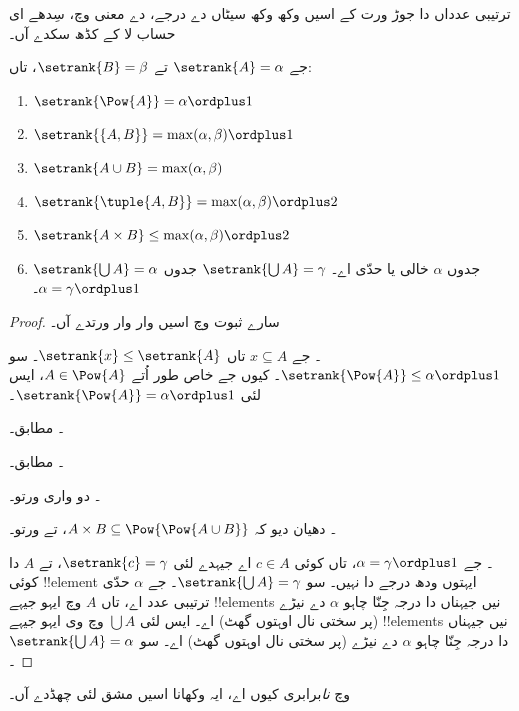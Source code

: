 \documentclass[../../../include/open-logic-section]{subfiles}
\begin{document}

ترتیبی عدداں دا جوڑ ورت کے اسیں وکھ وکھ سیٹاں دے درجے،  دے معنی وچ، سِدھے ای حساب لا کے کڈھ سکدے آں۔

\begin{lem}
جے $\setrank{A} = \alpha$ تے $\setrank{B} = \beta$، تاں:
\begin{enumerate}
	\item{} $\setrank{\Pow{A}} = \alpha\ordplus 1$
	\item{} $\setrank{\{A, B\}} = \max(\alpha,
	\beta) \ordplus 1$
	\item{} $\setrank{A \cup B} = \max(\alpha,
	\beta)$
	\item{} $\setrank{\tuple{A,B}} = \max(\alpha,
	\beta) \ordplus  2$
	\item{} $\setrank{A \times B} \leq \max(\alpha,
	\beta) \ordplus  2$
	\item{} $\setrank{\bigcup A} = \alpha$ جدوں
	$\alpha$ خالی یا حدّی اے۔ $\setrank{\bigcup A} = \gamma$ جدوں
	$\alpha = \gamma\ordplus 1$۔
\end{enumerate}
\end{lem}

\begin{proof}
سارے ثبوت وچ اسیں  وار وار ورتدے آں۔

\emph{۔} جے $x \subseteq A$ تاں $\setrank{x} \leq
\setrank{A}$۔ سو $\setrank{\Pow{A}} \leq \alpha \ordplus  1$۔ کیوں جے خاص طور اُتے $A
\in \Pow{A}$، ایس لئی $\setrank{\Pow{A}} = \alpha \ordplus  1$۔

\emph{۔}  مطابق۔

\emph{۔}  مطابق۔

\emph{۔}  دو واری ورتو۔

\emph{۔} دھیان دیو کہ $A \times B \subseteq
\Pow{\Pow{A \cup B}}$، تے  ورتو۔

\emph{۔} جے $\alpha = \gamma\ordplus 1$، تاں کوئی
$c \in A$ اے جیہدے لئی $\setrank{c} = \gamma$، تے $A$ دا کوئی !!{element} ایہتوں ودھ درجے دا نہیں۔ سو $\setrank{\bigcup A} = \gamma$۔ جے $\alpha$ حدّی ترتیبی عدد اے، تاں $A$ وچ ایہو جیہے !!{element}s نیں جیہناں دا درجہ جِنّا چاہو $\alpha$ دے نیڑے (پر سختی نال اوہتوں گھٹ) اے۔ ایس لئی $\bigcup A$ وچ وی ایہو جیہے !!{element}s نیں جیہناں دا درجہ جِنّا چاہو $\alpha$ دے نیڑے (پر سختی نال اوہتوں گھٹ) اے۔ سو $\setrank{\bigcup A} = \alpha$۔
\end{proof}
\noindent
{} وچ \emph{نا}برابری کیوں اے، ایہ وکھانا اسیں مشق لئی چھڈدے آں۔
\end{document}

